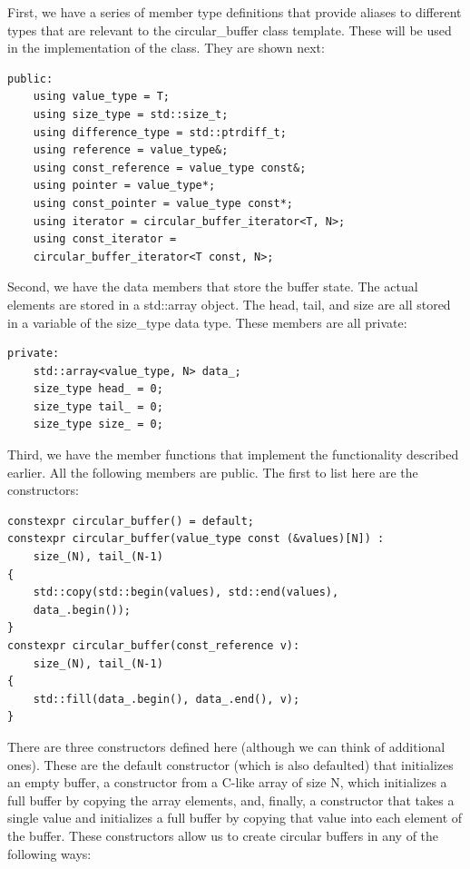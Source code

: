 First, we have a series of member type definitions that provide aliases to different types that are relevant to the circular\_buffer class template. These will be used in the implementation of the class. They are shown next:

\begin{lstlisting}[style=styleCXX]
	public:
	using value_type = T;
	using size_type = std::size_t;
	using difference_type = std::ptrdiff_t;
	using reference = value_type&;
	using const_reference = value_type const&;
	using pointer = value_type*;
	using const_pointer = value_type const*;
	using iterator = circular_buffer_iterator<T, N>;
	using const_iterator =
	circular_buffer_iterator<T const, N>;
\end{lstlisting}

Second, we have the data members that store the buffer state. The actual elements are stored in a std::array object. The head, tail, and size are all stored in a variable of the size\_type data type. These members are all private:

\begin{lstlisting}[style=styleCXX]
private:
	std::array<value_type, N> data_;
	size_type head_ = 0;
	size_type tail_ = 0;
	size_type size_ = 0;
\end{lstlisting}

Third, we have the member functions that implement the functionality described earlier. All the following members are public. The first to list here are the constructors:

\begin{lstlisting}[style=styleCXX]
constexpr circular_buffer() = default;
constexpr circular_buffer(value_type const (&values)[N]) :
	size_(N), tail_(N-1)
{
	std::copy(std::begin(values), std::end(values),
	data_.begin());
}
constexpr circular_buffer(const_reference v):
	size_(N), tail_(N-1)
{
	std::fill(data_.begin(), data_.end(), v);
}
\end{lstlisting}

There are three constructors defined here (although we can think of additional ones). These are the default constructor (which is also defaulted) that initializes an empty buffer, a constructor from a C-like array of size N, which initializes a full buffer by copying the array elements, and, finally, a constructor that takes a single value and initializes a full buffer by copying that value into each element of the buffer. These constructors allow us to create circular buffers in any of the following ways:

